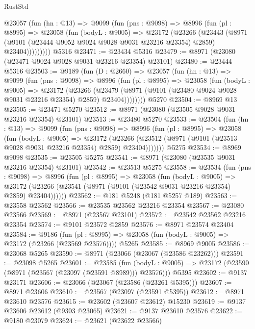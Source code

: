 \begin{lexlean}{RustStd}
\begin{coremodule}
      @23057
        (fun (hn : @13) =>
        @9099
          (fun (pns : @9098) =>
          @8996
            (fun (pl : @8995) =>
            @23058
              (fun (bodyL : @9005) =>
              @23172
                (@23266
                  (@23443
                    (@8971
                      (@9101 (@23444 @9052 @9024 @9028 @9031 @23216 @23354) @2859)
                      @23404)))))))))
    @5316
@23471 := @23434 @5316
@23479 := @8971 (@23080 (@23471 @9024 @9028 @9031 @23216 @23354) @23101)
@23480 := @23444 @5316
@23503 := @9189
    (fun (D : @2660) =>
    @23057
      (fun (hn : @13) =>
      @9099
        (fun (pns : @9098) =>
        @8996
          (fun (pl : @8995) =>
          @23058
            (fun (bodyL : @9005) =>
            @23172
              (@23266
                (@23479 (@8971 (@9101 (@23480 @9024 @9028 @9031 @23216 @23354) @2859) @23404))))))))
    @5270
@23504 := @8969 @13
@23505 := @23471 @5270
@23512 := @8971 (@23080 (@23505 @9028 @9031 @23216 @23354) @23101)
@23513 := @23480 @5270
@23533 := @23504
    (fun (hn : @13) =>
    @9099
      (fun (pns : @9098) =>
      @8996
        (fun (pl : @8995) =>
        @23058
          (fun (bodyL : @9005) =>
          @23172
            (@23266 (@23512 (@8971 (@9101 (@23513 @9028 @9031 @23216 @23354) @2859) @23404)))))))
    @5275
@23534 := @8969 @9098
@23535 := @23505 @5275
@23541 := @8971 (@23080 (@23535 @9031 @23216 @23354) @23101)
@23542 := @23513 @5275
@23558 := @23534
    (fun (pns : @9098) =>
    @8996
      (fun (pl : @8995) =>
      @23058
        (fun (bodyL : @9005) =>
        @23172 (@23266 (@23541 (@8971 (@9101 (@23542 @9031 @23216 @23354) @2859) @23404))))))
@23562 := @181 @5248 (@181 @5257 @189)
@23563 := @23558 @23562
@23566 := @23535 @23562 @23216 @23354
@23567 := @23080 @23566
@23569 := @8971 (@23567 @23101)
@23572 := @23542 @23562 @23216 @23354
@23574 := @9101 @23572 @2859
@23576 := @8971 @23574 @23404
@23584 := @9186
    (fun (pl : @8995) => @23058 (fun (bodyL : @9005) => @23172 (@23266 (@23569 @23576))))
    @5265
@23585 := @8969 @9005
@23586 := @23068 @5265
@23590 := @8971 (@23066 (@23067 (@23586 @23262)))
@23591 := @23098 @5265
@23601 := @23585
    (fun (bodyL : @9005) => @23172 (@23590 (@8971 (@23567 (@23097 (@23591 @8989))) @23576)))
    @5395
@23602 := @9137 @23171
@23606 := @23066 (@23067 (@23586 (@23261 @5395)))
@23607 := @8971 @23606
@23610 := @23567 (@23097 (@23591 @5395))
@23612 := @8971 @23610 @23576
@23615 := @23602 (@23607 @23612) @15230
@23619 := @9137 @23606 @23612 (@9303 @23065)
@23621 := @9137 @23610 @23576
@23622 := @9180 @23079
@23624 := @23621 (@23622 @23566)

\end{coremodule}
\end{lexlean}
